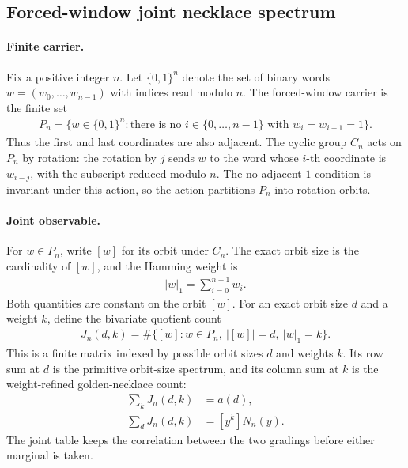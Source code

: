\subsection{Forced-window joint necklace spectrum}
\label{sec:window6-clock-gauge-invariant-joint-necklace-spectrum}

\paragraph{Finite carrier.}
Fix a positive integer $n$. Let $\{0,1\}^n$ denote the set of binary words $w=(w_0,\ldots,w_{n-1})$ with indices read modulo $n$. The forced-window carrier is the finite set
$$
\begin{aligned}
P_n=\{w\in \{0,1\}^n : \text{there is no } i\in\{0,\ldots,n-1\}\text{ with } w_i=w_{i+1}=1\}.
\end{aligned}
$$
Thus the first and last coordinates are also adjacent. The cyclic group $C_n$ acts on $P_n$ by rotation: the rotation by $j$ sends $w$ to the word whose $i$-th coordinate is $w_{i-j}$, with the subscript reduced modulo $n$. The no-adjacent-$1$ condition is invariant under this action, so the action partitions $P_n$ into rotation orbits.

\paragraph{Joint observable.}
For $w\in P_n$, write $[w]$ for its orbit under $C_n$. The exact orbit size is the cardinality of $[w]$, and the Hamming weight is
$$
\begin{aligned}
|w|_1=\sum_{i=0}^{n-1} w_i.
\end{aligned}
$$
Both quantities are constant on the orbit $[w]$. For an exact orbit size $d$ and a weight $k$, define the bivariate quotient count
$$
\begin{aligned}
J_n(d,k)=\#\{[w] : w\in P_n,\ |[w]|=d,\ |w|_1=k\}.
\end{aligned}
$$
This is a finite matrix indexed by possible orbit sizes $d$ and weights $k$. Its row sum at $d$ is the primitive orbit-size spectrum, and its column sum at $k$ is the weight-refined golden-necklace count:
$$
\begin{aligned}
\sum_k J_n(d,k)&=a(d),\\
\sum_d J_n(d,k)&=[y^k]N_n(y).
\end{aligned}
$$
The joint table keeps the correlation between the two gradings before either marginal is taken.

